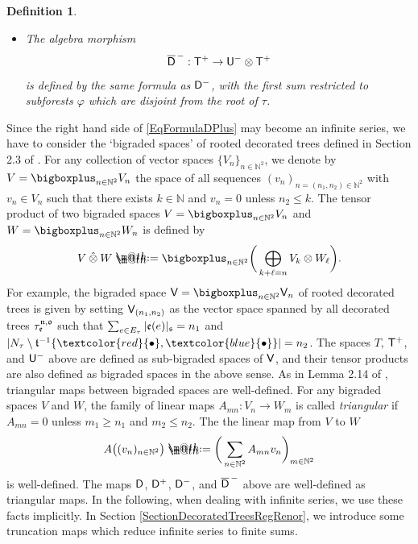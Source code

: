 \documentclass[10pt, reqno]{amsart}
\makeatletter
\numberwithin{subsection}{section}
\numberwithin{subsubsection}{subsection}
\numberwithin{equation}{section} %
\newenvironment{Rem}[1][\unskip]{%
    \begin{list}{\hspace{1.15cm}{\textsf{\textbf{{\small \textsl{Remark}} 
--}}}}{%
        \setlength{\topsep}{0pt}%
        \setlength{\leftmargin}{0pt}%
        \setlength{\rightmargin}{0pt}%
        \setlength{\listparindent}{0pt}%
        \setlength{\itemindent}{0pt}%
        \setlength{\parsep}{0pt}%
        \addtolength{\leftmargin}{0pt}%
        \addtolength{\rightmargin}{0pt}%
    } \item }{\hfill \end{list}\smallskip}
\theoremstyle{mystyle}
\theoremstyle{mystyle2}
\newtheorem*{defn*} {Definition}
\theoremstyle{mystyle3}
\newcommand{\mfs}{\mathfrak{s}}
\newcommand\bbN{\mathbb{N}}
\newcommand*{\defeq}{\mathrel{\rlap{%
                     \raisebox{0.3ex}{$\m@th\cdot$}}%
                     \raisebox{-0.3ex}{$\m@th\cdot$}}%
                     =}
\makeatother
\begin{document}
\begin{defn*}
\begin{itemize}
	\item[{\sf 3.}] The algebra morphism 
	$$
	\overline{\sf D}^{\,-} : {\sf T}^+ \to {\sf U}^-\otimes{\sf T}^+
	$$ 
	is defined by the same formula as ${\sf D}^-$, with the first sum restricted to subforests $\varphi$ which are disjoint from the root of $\tau$.
\end{itemize}
\end{defn*}

\medskip

{\sl  \begin{Rem}
Since the right hand side of \eqref{EqFormulaDPlus} may become an infinite series, we have to consider the `bigraded spaces' of rooted decorated trees defined in Section 2.3 of \cite{BHZ}. For any collection of vector spaces $\{V_n\}_{n\in\bbN^2}$, we denote by $V=\bigboxplus_{n\in\bbN^2}V_n$ the space of all sequences $(v_n)_{n=(n_1,n_2)\in\bbN^2}$ with $v_n\in V_n$ such that there exists $k\in\bbN$ and $v_n=0$ unless $n_2\le k$. The tensor product of two bigraded spaces $V=\bigboxplus_{n\in\bbN^2}V_n$ and $W=\bigboxplus_{n\in\bbN^2}W_n$ is defined by
$$
V\mathbin{\hat{\otimes}}W\defeq\bigboxplus_{n\in\bbN^2}\bigg(\bigoplus_{k+\ell=n}V_k\otimes W_\ell\bigg).
$$
For example, the bigraded space ${\sf V}=\bigboxplus_{n\in\bbN^2}{\sf V}_n$ of rooted decorated trees is given by setting ${\sf V}_{(n_1,n_2)}$ as the vector space spanned by all decorated trees $\tau_{\frak{e}}^{\frak{n},\frak{o}}$ such that $\sum_{e\in E_\tau}|\frak{e}(e)|_\mfs=n_1$ and $|N_\tau\setminus\frak{t}^{-1}\{\textcolor{red}{\bullet},\textcolor{blue}{\bullet}\}|=n_2$. The spaces $T$, ${\sf T}^+$, and ${\sf U}^-$ above are defined as sub-bigraded spaces of ${\sf V}$, and their tensor products are also defined as bigraded spaces in the above sense. As in Lemma 2.14 of \cite{BHZ}, triangular maps between bigraded spaces are well-defined. For any bigraded spaces $V$ and $W$, the family of linear maps $A_{mn}:V_n\to W_m$ is called {\em triangular} if $A_{mn}=0$ unless $m_1\ge n_1$ and $m_2\le n_2$. The the linear map from $V$ to $W$
$$
A\big((v_n)_{n\in\bbN^2}\big)\defeq\bigg(\sum_{n\in\bbN^2}A_{mn}v_n\bigg)_{m\in\bbN^2}
$$
is well-defined. The maps ${\sf D}$, ${\sf D}^+$, ${\sf D}^-$, and $\overline{\sf D}^{\,-}$ above are well-defined as triangular maps. In the following, when dealing with infinite series, we use these facts implicitly. In Section \ref{SectionDecoratedTreesRegRenor}, we introduce some truncation maps which reduce infinite series to finite sums.
\end{Rem} }
\end{document}
